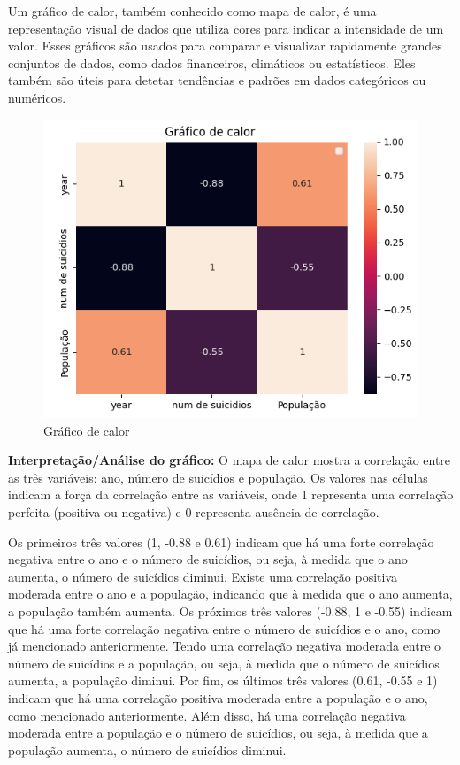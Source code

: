 \documentclass{article}
\begin{document}
Um gráfico de calor, também conhecido como mapa de calor, é uma representação visual de dados que utiliza cores para indicar a intensidade de um valor. Esses gráficos são usados para comparar e visualizar rapidamente grandes conjuntos de dados, como dados financeiros, climáticos ou estatísticos. Eles também são úteis para detetar tendências e padrões em dados categóricos ou numéricos. 
\newline
\bigskip
\begin{figure}[ht]
    \centering
   \includegraphics[scale=0.8]{mapacalor.png}
    \caption{Gráfico de calor}
   \label{fig:Graficalor}
\end{figure}
 \newline
 \textbf{Interpretação/Análise do gráfico:}
 \newline
O mapa de calor mostra a correlação entre as três variáveis: ano, número de suicídios e população. Os valores nas células indicam a força da correlação entre as variáveis, onde 1 representa uma correlação perfeita (positiva ou negativa) e 0 representa ausência de correlação.


Os primeiros três valores (1, -0.88 e 0.61) indicam que há uma forte correlação negativa entre o ano e o número de suicídios, ou seja, à medida que o ano aumenta, o número de suicídios diminui. Existe uma correlação positiva moderada entre o ano e a população, indicando que à medida que o ano aumenta, a população também aumenta.
Os próximos três valores (-0.88, 1 e -0.55) indicam que há uma forte correlação negativa entre o número de suicídios e o ano, como já mencionado anteriormente. Tendo uma correlação negativa moderada entre o número de suicídios e a população, ou seja, à medida que o número de suicídios aumenta, a população diminui.
\newpage
Por fim, os últimos três valores (0.61, -0.55 e 1) indicam que há uma correlação positiva moderada entre a população e o ano, como mencionado anteriormente. Além disso, há uma correlação negativa moderada entre a população e o número de suicídios, ou seja, à medida que a população aumenta, o número de suicídios diminui.
\end{document}
